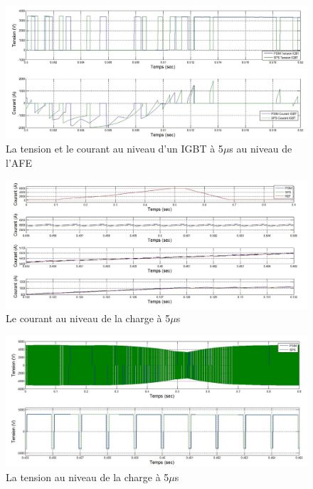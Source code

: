 \documentclass[11pt,letterpaper,final]{report}
\begin{document}
\begin{figure}[htb]
\centering
\includegraphics[scale=0.5]{Fig/Hach_AFE/5u/IGBT_AFE.jpg}
\caption{La tension et le courant au niveau d'un IGBT à 5$\mu$s au niveau de l'AFE}
\label{AF_HA_IGBT5}
\end{figure}

\begin{figure}[htb]
\centering
\includegraphics[scale=0.5]{Fig/Hach_AFE/5u/hach_cou_ch.jpg}
\caption{Le courant au niveau de la charge à 5$\mu$s}
\label{AF_HA_CHA5}
\end{figure}

\begin{figure}[htb]
\centering
\includegraphics[scale=0.5]{Fig/Hach_AFE/5u/hach_ten_ch.jpg}
\caption{La tension au niveau de la charge à 5$\mu$s}
\label{AF_HA_CHV5}
\end{figure}
\end{document}

